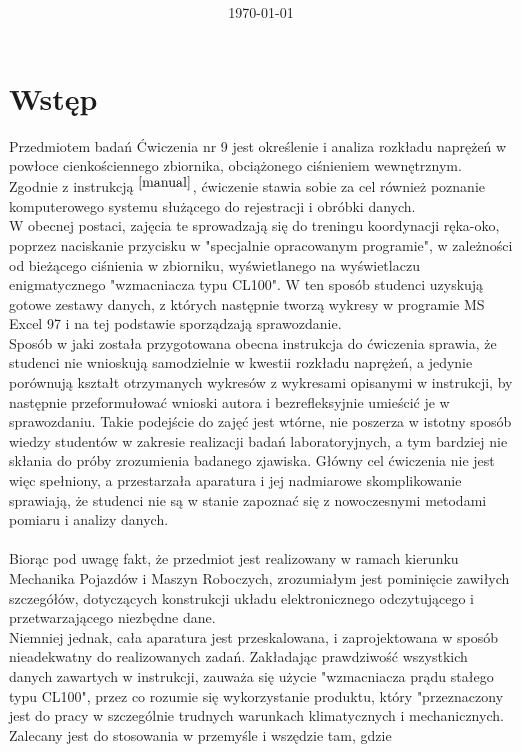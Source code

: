 \documentclass[12pt]{article}
\title{\mytitle \\
	\large \mysubtitle}
\author{\me}
\date{\today}
\begin{document}
	\pagestyle{fancy}
	\maketitle
	\newpage
\section{Wstęp}
	Przedmiotem badań Ćwiczenia nr 9 jest określenie i analiza rozkładu naprężeń w powłoce cienkościennego zbiornika, obciążonego ciśnieniem wewnętrznym. Zgodnie z instrukcją $^{\cite{manual}}$, ćwiczenie stawia sobie za cel również poznanie komputerowego systemu służącego do rejestracji i obróbki danych. \\
	W obecnej postaci, zajęcia te sprowadzają się do treningu koordynacji ręka-oko, poprzez naciskanie przycisku w "specjalnie opracowanym programie", w zależności od bieżącego ciśnienia w zbiorniku, wyświetlanego na wyświetlaczu enigmatycznego "wzmacniacza typu CL100". W ten sposób studenci uzyskują gotowe zestawy danych, z których następnie tworzą wykresy w programie MS Excel 97 i na tej podstawie sporządzają sprawozdanie.\\
	Sposób w jaki została przygotowana obecna instrukcja do ćwiczenia sprawia, że studenci nie wnioskują samodzielnie w kwestii rozkładu naprężeń, a jedynie porównują kształt otrzymanych wykresów z wykresami opisanymi w instrukcji, by następnie przeformułować wnioski autora i bezrefleksyjnie umieścić je w sprawozdaniu. Takie podejście do zajęć jest wtórne, nie poszerza w istotny sposób wiedzy studentów w zakresie realizacji badań laboratoryjnych, a tym bardziej nie skłania do próby zrozumienia badanego zjawiska. Główny cel ćwiczenia nie jest więc spełniony, a przestarzała aparatura i jej nadmiarowe skomplikowanie sprawiają, że studenci nie są w stanie zapoznać się z nowoczesnymi metodami pomiaru i analizy danych.\\\\
	Biorąc pod uwagę fakt, że przedmiot jest realizowany w ramach kierunku Mechanika Pojazdów i Maszyn Roboczych, zrozumiałym jest pominięcie zawiłych szczegółów, dotyczących konstrukcji układu elektronicznego odczytującego i przetwarzającego niezbędne dane.\\
	Niemniej jednak, cała aparatura jest przeskalowana, i zaprojektowana w sposób nieadekwatny do realizowanych zadań. Zakładając prawdziwość wszystkich danych zawartych w instrukcji, zauważa się użycie "wzmacniacza prądu stałego typu CL100", przez co rozumie się wykorzystanie produktu, który "przeznaczony jest do pracy w szczególnie trudnych warunkach	klimatycznych i mechanicznych. Zalecany jest do stosowania w przemyśle i wszędzie tam, gdzie
\end{document}
